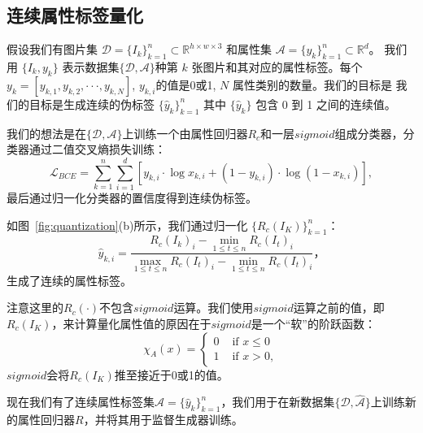 \subsection{连续属性标签量化}
假设我们有图片集 $\mathcal{D} = \{I_k\}_{k=1}^n \subset \mathbb{R}^{h \times w \times 3}$ 和属性集 $\mathcal{A} = \{y_k\}_{k=1}^n \subset \mathbb{R}^{d}$。 我们用 $\{I_k, y_k\}$ 表示数据集$\{\mathcal{D}, \mathcal{A}\}$种第 $k$ 张图片和其对应的属性标签。每个$y_k=[y_{k,1}, y_{k,2}, \cdot \cdot \cdot ,y_{k,N}]$, $y_{k,i}$的值是0或1, $N$ 属性类别的数量。我们的目标是 我们的目标是生成连续的伪标签 $\{\hat{y}_k\}_{k=1}^n$ 其中 $\{\hat{y}_k\}$ 包含 0 到 1 之间的连续值。

我们的想法是在$\{\mathcal{D}, \mathcal{A}\}$上训练一个由属性回归器$R_c$和一层$sigmoid$组成分类器，分类器通过二值交叉熵损失训练：
\begin{equation}
     \mathcal{L}_{BCE} = \sum_{k=1}^n \sum_{i=1}^d [y_{k,i} \cdot \log x_{k,i}+\left(1-y_{k,i}\right) \cdot \log \left(1-x_{k,i}\right)],
\end{equation}
最后通过归一化分类器的置信度得到连续伪标签。

如图~\ref{fig:quantization}(b)所示，我们通过归一化 $\{R_c(I_K)\}_{k=1}^n$：
\begin{equation}
     \hat{y}_{k,i} = \frac{R_c(I_k)_i - \min \limits_{1 \leq t \leq n}R_c(I_t)_i}{\max \limits_{1 \leq t \leq n}R_c(I_t)_i - \min \limits_{1 \leq t \leq n}R_c(I_t)_i}，
     \label{eq3}
\end{equation}
生成了连续的属性标签。

注意这里的$R_c(\cdot)$不包含$sigmoid$运算。我们使用$sigmoid$运算之前的值，即$R_c(I_K)$，来计算量化属性值的原因在于$sigmoid$是一个“软”的阶跃函数：
\begin{equation}
   \chi_{A}(x)=\left\{\begin{array}{ll}
      0 & \text { if } x \leq 0 \\
      1 & \text { if } x > 0,
      \end{array}\right.
\end{equation}
$sigmoid$会将$R_c(I_K)$推至接近于0或1的值。

现在我们有了连续属性标签集$\hat{\mathcal{A}}=\{\hat{y}_k\}_{k=1}^n$，我们用于在新数据集$\{\mathcal{D}, \hat{\mathcal{A}}\}$上训练新的属性回归器$R$，并将其用于监督生成器训练。


